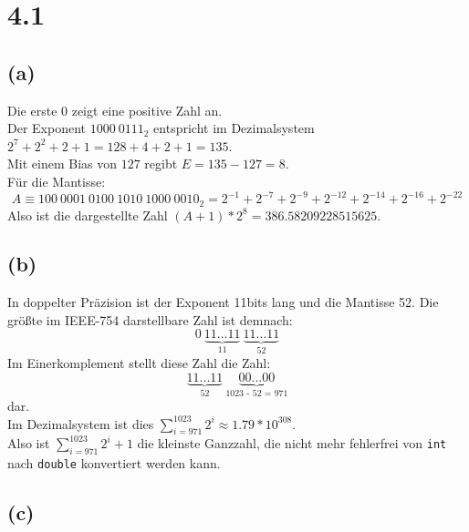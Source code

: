 \section*{4.1}
\subsection*{(a)}
Die erste $0$ zeigt eine positive Zahl an.\\
Der Exponent $1000\ 0111_2$ entspricht im Dezimalsystem $2^7 + 2^2 + 2 + 1 = 128 + 4 + 2 + 1 = 135$.\\
Mit einem Bias von $127$ regibt $E = 135 - 127 = 8$.\\
Für die Mantisse: 
$$A \equiv 100\ 0001\ 0100\ 1010\ 1000\ 0010_2 = 2^{-1} + 2^{-7} + 2^{-9} + 2^{-12} + 2^{-14} + 2^{-16} + 2^{-22}$$
Also ist die dargestellte Zahl $(A + 1) * 2^8 = 386.58209228515625$.

\subsection*{(b)}
In doppelter Präzision ist der Exponent 11bits lang und die Mantisse 52. Die größte im IEEE-754 darstellbare Zahl ist demnach:
$$0\ \underbrace{11...11}_\text{11}\ \underbrace{11...11}_\text{52}$$
Im Einerkomplement stellt diese Zahl die Zahl:
$$\underbrace{11...11}_\text{52}\ \underbrace{00...00}_\text{1023 - 52 = 971}$$
dar.\\
Im Dezimalsystem ist dies $\sum_{i = 971}^{1023} 2^i \approx 1.79 * 10^{308}$.\\
Also ist $\sum_{i = 971}^{1023} 2^i + 1$ die kleinste Ganzzahl, die nicht mehr fehlerfrei von \verb+int+ nach \verb+double+ konvertiert werden kann.

\subsection*{(c)}
